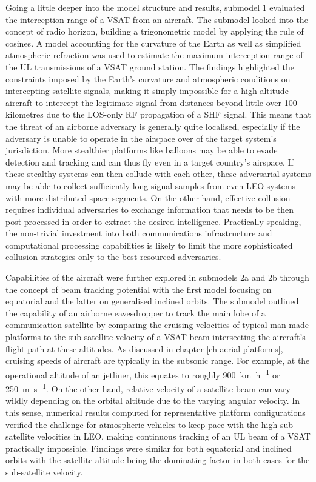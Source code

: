 \documentclass[english, 12pt, a4paper, elec, utf8, a-1b, online]{aaltothesis}
\begin{document}
Going a little deeper into the model structure and results, submodel 1 evaluated the interception range of a VSAT from an aircraft. The submodel looked into the concept of radio horizon, building a trigonometric model by applying the rule of cosines.
A model accounting for the curvature of the Earth as well as simplified atmospheric refraction was used to estimate the maximum interception range of the UL transmissions of a VSAT ground station. The findings highlighted the constraints imposed by the Earth's curvature and atmospheric conditions on intercepting satellite signals, making it simply impossible for a high-altitude aircraft to intercept the legitimate signal from distances beyond little over 100 kilometres due to the LOS-only RF propagation of a SHF signal.
This means that the threat of an airborne adversary is generally quite localised, especially if the adversary is unable to operate in the airspace over of the target system's jurisdiction. More stealthier platforms like balloons may be able to evade detection and tracking and can thus fly even in a target country's airspace. If these stealthy systems can then collude with each other, these adversarial systems may be able to collect sufficiently long signal samples from even LEO systems with more distributed space segments. On the other hand, effective collusion requires individual adversaries to exchange information that needs to be then post-processed in order to extract the desired intelligence. Practically speaking, the non-trivial investment into both communications infrastructure and computational processing capabilities is likely to limit the more sophisticated collusion strategies only to the best-resourced adversaries.

Capabilities of the aircraft were further explored in submodels 2a and 2b through the concept of beam tracking potential with the first model focusing on equatorial and the latter on generalised inclined orbits. The submodel outlined the capability of an airborne eavesdropper to track the main lobe of a communication satellite by comparing the cruising velocities of typical man-made platforms to the sub-satellite velocity of a VSAT beam intersecting the aircraft's flight path at these altitudes.
As discussed in chapter \ref{ch-aerial-platforms}, cruising speeds of aircraft are typically in the subsonic range.
For example, at the operational altitude of an jetliner, this equates to roughly \SI[per-mode=repeated-symbol]{900}{\kilo\meter\per\hour} or \SI[per-mode=repeated-symbol]{250}{\meter\per\second}.
On the other hand, relative velocity of a satellite beam can vary wildly depending on the orbital altitude due to the varying angular velocity.
In this sense, numerical results computed for representative platform configurations verified the challenge for atmospheric vehicles to keep pace with the high sub-satellite velocities in LEO, making continuous tracking of an UL beam of a VSAT practically impossible. Findings were similar for both equatorial and inclined orbits with the satellite altitude being the dominating factor in both cases for the sub-satellite velocity.
\end{document}
